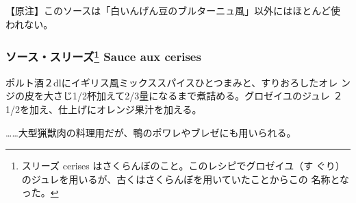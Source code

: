 \documentclass[twoside,12Q,b5paper]{escoffierltjsbook}
\newenvironment{recette}{\begin{small}\begin{spacing}{1}\begin{multicols}{2}}{\end{multicols}\end{spacing}\end{small}}
\begin{document}
\begin{recette}
【原注】このソースは「白いんげん豆のブルターニュ風」以外にはほとんど使
われない。

\subsubsection*{\texorpdfstring{ソース・スリーズ\footnote{スリーズ
  cerises はさくらんぼのこと。このレシピでグロゼイユ（す
  ぐり）のジュレを用いるが、古くはさくらんぼを用いていたことからこの
  名称となった。} Sauce aux
cerises}{ソース・スリーズ Sauce aux cerises}}\label{ux30bdux30fcux30b9ux30b9ux30eaux30fcux30ba6-sauce-aux-cerises}

ポルト酒２dlにイギリス風ミックススパイスひとつまみと、すりおろしたオレ
ンジの皮を大さじ1/2杯加えて2/3量になるまで煮詰める。グロゼイユのジュレ
２1/2を加え、仕上げにオレンジ果汁を加える。

\ldots{}\ldots{}大型猟獣肉の料理用だが、鴨のポワレやブレゼにも用いられる。




\end{recette}%
\end{document}
